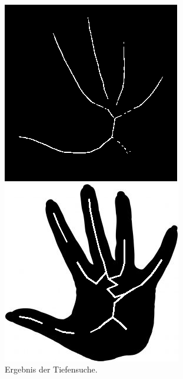 \begin{figure}[htbp]
	\centering
	\begin{minipage}{5cm}
		\centering
		\includegraphics[width=1.0\linewidth]{./fig/hand-skelett}
	\end{minipage}
	\hspace{2cm}
	\begin{minipage}{5cm}
		\centering
		\includegraphics[width=1.0\linewidth]{./fig/hand-dfs}
	\end{minipage}
	\caption{Ergebnis der Tiefensuche.}
	\label{fig:hand_DFS}
	\end{figure}\\
